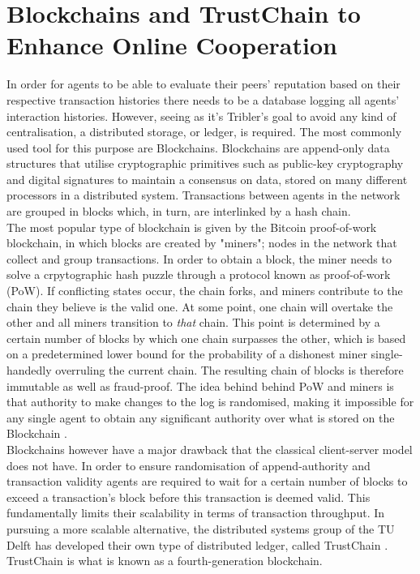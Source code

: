 \section{Blockchains and TrustChain to Enhance Online Cooperation}
\label{sec:Blockchains & TrustChain}
\noindent{}In order for agents to be able to evaluate their peers' reputation based on their respective transaction histories there needs to be a database logging all agents' interaction histories. However, seeing as it's Tribler's goal to avoid any kind of centralisation, a distributed storage, or ledger, is required. The most commonly used tool for this purpose are Blockchains. Blockchains are append-only data structures that utilise cryptographic primitives such as public-key cryptography and digital signatures to maintain a consensus on data, stored on many different processors in a distributed system. Transactions between agents in the network are grouped in blocks which, in turn, are interlinked by a hash chain. \vspace{1em}\\

\noindent{}The most popular type of blockchain is given by the Bitcoin proof-of-work blockchain, in which blocks are created by "miners"; nodes in the network that collect and group transactions. In order to obtain a block, the miner needs to solve a crpytographic hash puzzle through a protocol known as proof-of-work (PoW). If conflicting states occur, the chain forks, and miners contribute to the chain they believe is the valid one. At some point, one chain will overtake the other and all miners transition to {\it that} chain. This point is determined by a certain number of blocks by which one chain surpasses the other, which is based on a predetermined lower bound for the probability of a dishonest miner single-handedly overruling the current chain. The resulting chain of blocks is therefore immutable as well as fraud-proof. The idea behind behind PoW and miners is that authority to make changes to the log is randomised, making it impossible for any single agent to obtain any significant authority over what is stored on the Blockchain \cite{Bitcoin}. \vspace{1em}\\

\noindent{}Blockchains however have a major drawback that the classical client-server model does not have. In order to ensure randomisation of append-authority and transaction validity agents are required to wait for a certain number of blocks to exceed a transaction's block before this transaction is deemed valid. This fundamentally limits their scalability in terms of transaction throughput. In pursuing a more scalable alternative, the distributed systems group of the TU Delft has developed their own type of distributed ledger, called TrustChain \cite{TrustChain: A Sybil-resistant scalable blockchain}. TrustChain is what is known as a fourth-generation blockchain. \vspace{1em}\\


